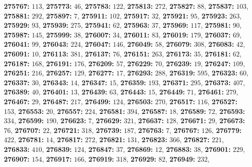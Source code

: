\textsf{\bfseries 275767:} $113$, \textsf{\bfseries 275773:} $46$, \textsf{\bfseries 275783:} $122$, \textsf{\bfseries 275813:} $272$, \textsf{\bfseries 275827:} $88$, \textsf{\bfseries 275837:} $103$, \textsf{\bfseries 275881:} $292$, \textsf{\bfseries 275897:} $7$, \textsf{\bfseries 275911:} $102$, \textsf{\bfseries 275917:} $32$, \textsf{\bfseries 275921:} $95$, \textsf{\bfseries 275923:} $263$, \textsf{\bfseries 275929:} $93$, \textsf{\bfseries 275939:} $275$, \textsf{\bfseries 275941:} $62$, \textsf{\bfseries 275963:} $37$, \textsf{\bfseries 275969:} $117$, \textsf{\bfseries 275981:} $90$, \textsf{\bfseries 275987:} $145$, \textsf{\bfseries 275999:} $38$, \textsf{\bfseries 276007:} $34$, \textsf{\bfseries 276011:} $83$, \textsf{\bfseries 276019:} $179$, \textsf{\bfseries 276037:} $69$, \textsf{\bfseries 276041:} $99$, \textsf{\bfseries 276043:} $224$, \textsf{\bfseries 276047:} $146$, \textsf{\bfseries 276049:} $58$, \textsf{\bfseries 276079:} $308$, \textsf{\bfseries 276083:} $42$, \textsf{\bfseries 276091:} $10$, \textsf{\bfseries 276113:} $381$, \textsf{\bfseries 276137:} $76$, \textsf{\bfseries 276151:} $263$, \textsf{\bfseries 276173:} $35$, \textsf{\bfseries 276181:} $62$, \textsf{\bfseries 276187:} $168$, \textsf{\bfseries 276191:} $176$, \textsf{\bfseries 276209:} $57$, \textsf{\bfseries 276229:} $70$, \textsf{\bfseries 276239:} $19$, \textsf{\bfseries 276247:} $109$, \textsf{\bfseries 276251:} $216$, \textsf{\bfseries 276257:} $129$, \textsf{\bfseries 276277:} $17$, \textsf{\bfseries 276293:} $288$, \textsf{\bfseries 276319:} $595$, \textsf{\bfseries 276323:} $60$, \textsf{\bfseries 276337:} $30$, \textsf{\bfseries 276343:} $14$, \textsf{\bfseries 276347:} $15$, \textsf{\bfseries 276359:} $193$, \textsf{\bfseries 276371:} $295$, \textsf{\bfseries 276373:} $407$, \textsf{\bfseries 276389:} $40$, \textsf{\bfseries 276401:} $13$, \textsf{\bfseries 276439:} $63$, \textsf{\bfseries 276443:} $15$, \textsf{\bfseries 276449:} $71$, \textsf{\bfseries 276461:} $279$, \textsf{\bfseries 276467:} $29$, \textsf{\bfseries 276487:} $217$, \textsf{\bfseries 276499:} $124$, \textsf{\bfseries 276503:} $270$, \textsf{\bfseries 276517:} $116$, \textsf{\bfseries 276527:} $153$, \textsf{\bfseries 276553:} $20$, \textsf{\bfseries 276557:} $224$, \textsf{\bfseries 276581:} $394$, \textsf{\bfseries 276587:} $18$, \textsf{\bfseries 276589:} $72$, \textsf{\bfseries 276593:} $334$, \textsf{\bfseries 276599:} $190$, \textsf{\bfseries 276623:} $7$, \textsf{\bfseries 276629:} $321$, \textsf{\bfseries 276637:} $128$, \textsf{\bfseries 276671:} $29$, \textsf{\bfseries 276673:} $76$, \textsf{\bfseries 276707:} $22$, \textsf{\bfseries 276721:} $318$, \textsf{\bfseries 276739:} $187$, \textsf{\bfseries 276763:} $7$, \textsf{\bfseries 276767:} $126$, \textsf{\bfseries 276779:} $422$, \textsf{\bfseries 276781:} $14$, \textsf{\bfseries 276817:} $272$, \textsf{\bfseries 276821:} $131$, \textsf{\bfseries 276823:} $366$, \textsf{\bfseries 276827:} $221$, \textsf{\bfseries 276833:} $410$, \textsf{\bfseries 276839:} $124$, \textsf{\bfseries 276847:} $37$, \textsf{\bfseries 276869:} $12$, \textsf{\bfseries 276883:} $38$, \textsf{\bfseries 276901:} $229$, \textsf{\bfseries 276907:} $154$, \textsf{\bfseries 276917:} $166$, \textsf{\bfseries 276919:} $318$, \textsf{\bfseries 276929:} $82$, \textsf{\bfseries 276949:} $232$, 

